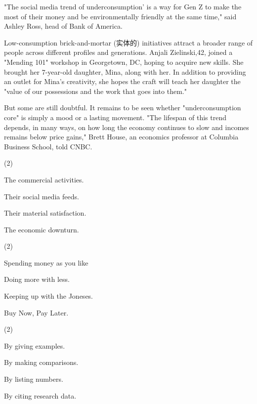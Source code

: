 \documentclass{英语试卷}
\begin{document}
\par "The social media trend of underconsumption' is a way for Gen Z to make the most of their money and be environmentally friendly at the same time," said Ashley Ross, head of Bank of America.\par
\par Low-consumption brick-and-mortar (实体的) initiatives attract a broader range of people across different profiles and generations. Anjali Zielinski,42, joined a "Mending 101" workshop in Georgetown, DC, hoping to acquire new skills. She brought her 7-year-old daughter, Mina, along with her. In addition to providing an outlet for Mina's creativity, she hopes the craft will teach her daughter the "value of our possessions and the work that goes into them."\par
\par But some are still doubtful. It remains to be seen whether "underconsumption core" is simply a mood or a lasting movement. "The lifespan of this trend depends, in many ways, on how long the economy continues to slow and incomes remains below price gains," Brett House, an economics professor at Columbia Business School, told CNBC.\par
{}
\begin{choices}(2)
  \item The commercial activities.
  \item Their social media feeds.
  \item Their material satisfaction.
  \item The economic downturn.
\end{choices}
\begin{choices}(2)
  \item Spending money as you like
  \item Doing more with less.
  \item Keeping up with the Joneses.
  \item Buy Now, Pay Later.
\end{choices}
\begin{choices}(2)
  \item By giving examples.
  \item By making comparisons.
  \item By listing numbers.
  \item By citing research data.
\end{choices}
\end{document}
